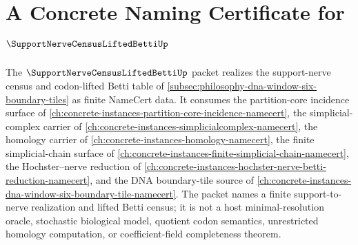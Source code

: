 \chapter{A Concrete Naming Certificate for $\SupportNerveCensusLiftedBettiUp$}
\label{ch:concrete-instances-support-nerve-census-lifted-betti-namecert}

The $\SupportNerveCensusLiftedBettiUp$ packet realizes the support-nerve census and codon-lifted Betti table of \autoref{subsec:philosophy-dna-window-six-boundary-tiles} as finite NameCert data. It consumes the partition-core incidence surface of \autoref{ch:concrete-instances-partition-core-incidence-namecert}, the simplicial-complex carrier of \autoref{ch:concrete-instances-simplicialcomplex-namecert}, the homology carrier of \autoref{ch:concrete-instances-homology-namecert}, the finite simplicial-chain surface of \autoref{ch:concrete-instances-finite-simplicial-chain-namecert}, the Hochster--nerve reduction of \autoref{ch:concrete-instances-hochster-nerve-betti-reduction-namecert}, and the DNA boundary-tile source of \autoref{ch:concrete-instances-dna-window-six-boundary-tile-namecert}. The packet names a finite support-to-nerve realization and lifted Betti census; it is not a host minimal-resolution oracle, stochastic biological model, quotient codon semantics, unrestricted homology computation, or coefficient-field completeness theorem.

